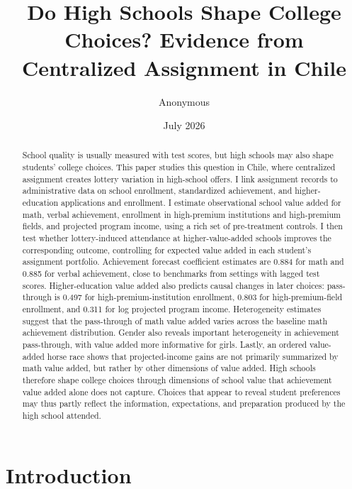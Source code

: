 \documentclass[a4paper, article, english, oneside, unknownkeysallowed, 12pt]{memoir}
\title{Do High Schools Shape College Choices? Evidence from Centralized Assignment in Chile}
\author{Anonymous}
\date{July 2026}
\begin{document}
\maketitle

\begin{abstract}
School quality is usually measured with test scores, but high schools may also shape students' college choices.
This paper studies this question in Chile, where centralized assignment creates lottery variation in high-school offers.
I link assignment records to administrative data on school enrollment, standardized achievement, and higher-education applications and enrollment.
I estimate observational school value added for math, verbal achievement, enrollment in high-premium institutions and high-premium fields, and projected program income, using a rich set of pre-treatment controls.
I then test whether lottery-induced attendance at higher-value-added schools improves the corresponding outcome, controlling for expected value added in each student's assignment portfolio.
Achievement forecast coefficient estimates are 0.884 for math and 0.885 for verbal achievement, close to benchmarks from settings with lagged test scores.
Higher-education value added also predicts causal changes in later choices: pass-through is 0.497 for high-premium-institution enrollment, 0.803 for high-premium-field enrollment, and 0.311 for log projected program income.
Heterogeneity estimates suggest that the pass-through of math value added varies across the baseline math achievement distribution.
Gender also reveals important heterogeneity in achievement pass-through, with value added more informative for girls.
Lastly, an ordered value-added horse race shows that projected-income gains are not primarily summarized by math value added, but rather by other dimensions of value added.
High schools therefore shape college choices through dimensions of school value that achievement value added alone does not capture.
Choices that appear to reveal student preferences may thus partly reflect the information, expectations, and preparation produced by the high school attended.
\end{abstract}

\setcounter{tocdepth}{2}
\renewcommand\contentsname{}

\clearpage
\section{Introduction}
\end{document}
